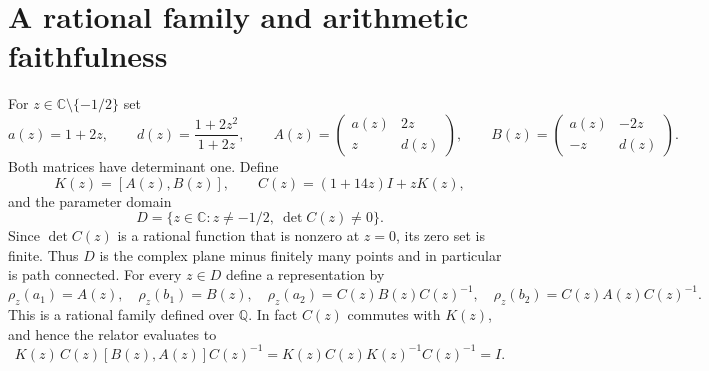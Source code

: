 \documentclass[11pt,letterpaper]{amsart}
\theoremstyle{definition}
\theoremstyle{remark}
\numberwithin{equation}{section}
\begin{document}
\section{A rational family and arithmetic faithfulness}\label{sec:curve}

For $z\in\mathbb C\setminus\{-1/2\}$ set
\[
 a(z)=1+2z,\qquad d(z)=\frac{1+2z^2}{1+2z},\qquad
 A(z)=\begin{pmatrix}a(z)&2z\\z&d(z)\end{pmatrix},\qquad
 B(z)=\begin{pmatrix}a(z)&-2z\\-z&d(z)\end{pmatrix}.
\]
Both matrices have determinant one. Define
\[
 K(z)=[A(z),B(z)],\qquad
 C(z)=(1+14z)I+zK(z),
\]
and the parameter domain
\[
 D=\{z\in\mathbb C:z\ne-1/2,\ \det C(z)\ne0\}.
\]
Since $\det C(z)$ is a rational function that is nonzero at $z=0$,
its zero set is finite. Thus $D$ is the complex plane minus finitely
many points and in particular is path connected.
For every $z\in D$ define a representation by
\begin{equation}\label{eq:explicit-curve}
 \rho_z(a_1)=A(z),\quad \rho_z(b_1)=B(z),\quad
 \rho_z(a_2)=C(z)B(z)C(z)^{-1},\quad
 \rho_z(b_2)=C(z)A(z)C(z)^{-1}.
\end{equation}
This is a rational family defined over $\mathbb Q$. In fact $C(z)$
commutes with $K(z)$, and hence the relator evaluates to
\[
 K(z)\,C(z)[B(z),A(z)]C(z)^{-1}
 =K(z)C(z)K(z)^{-1}C(z)^{-1}=I.
\]
\end{document}
